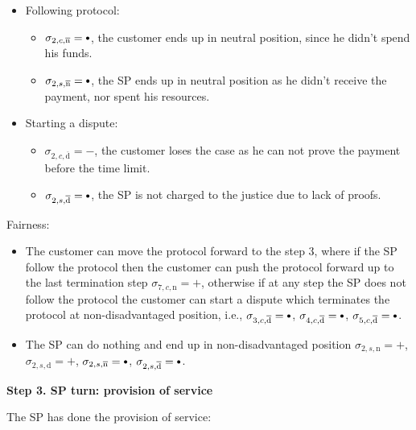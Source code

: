 \documentclass{ieeeaccess}
\newcommand\sbullet[1][.75]{\mathbin{\ThisStyle{\vcenter{\hbox{%
  \scalebox{#1}{$\SavedStyle\bullet$}}}}}%
}
\begin{document}
\begin{itemize}
\item
  Following protocol:
  \begin{itemize}
  \item
    \(\sigma_{2, c, \overline{\mathrm{n}}} = \sbullet\), the customer ends up in neutral position, since he didn't spend his funds.
  \item
    \(\sigma_{2, s, \overline{\mathrm{n}}} = \sbullet\), the SP ends up in neutral position as he didn't receive the payment, nor spent his resources.
  \end{itemize}
\item
  Starting a dispute:

  \begin{itemize}
  
  \item
    \(\sigma_{2, c, \overline{\mathrm{d}}} = -\), the customer loses the case as he can not prove the payment before the time limit.
  \item
    \(\sigma_{2, s, \overline{\mathrm{d}}} = \sbullet\), the SP is not charged to the justice due to lack of proofs.
  \end{itemize}
\end{itemize}

Fairness:

\begin{itemize}

\item
  The customer can move the protocol forward to the step 3, where if the
  SP follow the protocol then the customer can push the protocol forward
  up to the last termination step \(\sigma_{7, c, \mathrm{n}} = +\),
  otherwise if at any step the SP does not follow the protocol the
  customer can start a dispute which terminates the protocol at
  non-disadvantaged position, i.e.,
  \(\sigma_{3, c, \overline{\mathrm{d}}} = \sbullet\),
  \(\sigma_{4, c, \overline{\mathrm{d}}} = \sbullet\),
  \(\sigma_{5, c, \overline{\mathrm{d}}} = \sbullet\).
\item
  The SP can do nothing and end up in non-disadvantaged position
  \(\sigma_{2, s, \mathrm{n}} = +\), \(\sigma_{2, s, \mathrm{d}} = +\),
  \(\sigma_{2, s, \overline{\mathrm{n}}} = \sbullet\),
  \(\sigma_{2, s, \overline{\mathrm{d}}} = \sbullet\).
\end{itemize}

\noindent \textbf
{Step 3. SP turn: provision of service}\label{step-3-provision-of-service}

The SP has done the provision of service:
\end{document}

